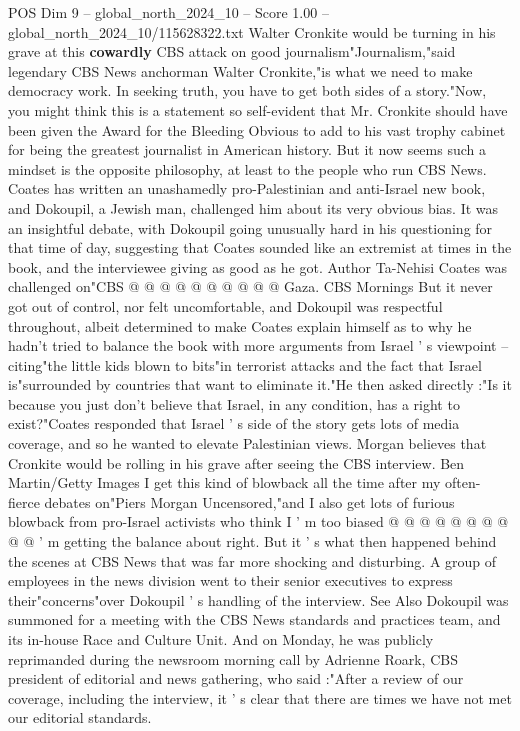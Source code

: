 \begin{textsample}{POS Dim 9 – global\_north\_2024\_10 – Score 1.00 – global\_north\_2024\_10/115628322.txt}  \label{ex:f9_pos_226}
Walter Cronkite would be turning in his grave at this \textbf{cowardly} CBS attack on good journalism"Journalism,"said legendary CBS News anchorman Walter Cronkite,"is what we need to make democracy work.
In seeking truth, you have to get both sides of a story."Now, you might think this is a statement so self-evident that Mr.
Cronkite should have been given the Award for the Bleeding Obvious to add to his vast trophy cabinet for being the greatest journalist in American history.
But it now seems such a mindset is the opposite philosophy, at least to the people who run CBS News.
Coates has written an unashamedly pro-Palestinian and anti-Israel new book, and Dokoupil, a Jewish man, challenged him about its very obvious bias.
It was an insightful debate, with Dokoupil going unusually hard in his questioning for that time of day, suggesting that Coates sounded like an extremist at times in the book, and the interviewee giving as good as he got.
Author Ta-Nehisi Coates was challenged on"CBS @ @ @ @ @ @ @ @ @ @ Gaza.
CBS Mornings But it never got out of control, nor felt uncomfortable, and Dokoupil was respectful throughout, albeit determined to make Coates explain himself as to why he hadn't tried to balance the book with more arguments from Israel ' s viewpoint -- citing"the little kids blown to bits"in terrorist attacks and the fact that Israel is"surrounded by countries that want to eliminate it."He then asked directly :"Is it because you just don't believe that Israel, in any condition, has a right to exist?"Coates responded that Israel ' s side of the story gets lots of media coverage, and so he wanted to elevate Palestinian views.
Morgan believes that Cronkite would be rolling in his grave after seeing the CBS interview.
Ben Martin/Getty Images I get this kind of blowback all the time after my often-fierce debates on"Piers Morgan Uncensored,"and I also get lots of furious blowback from pro-Israel activists who think I ' m too biased @ @ @ @ @ @ @ @ @ @ ' m getting the balance about right.
But it ' s what then happened behind the scenes at CBS News that was far more shocking and disturbing.
A group of employees in the news division went to their senior executives to express their"concerns"over Dokoupil ' s handling of the interview.
See Also Dokoupil was summoned for a meeting with the CBS News standards and practices team, and its in-house Race and Culture Unit.
And on Monday, he was publicly reprimanded during the newsroom morning call by Adrienne Roark, CBS president of editorial and news gathering, who said :"After a review of our coverage, including the interview, it ' s clear that there are times we have not met our editorial standards.

\end{textsample}
